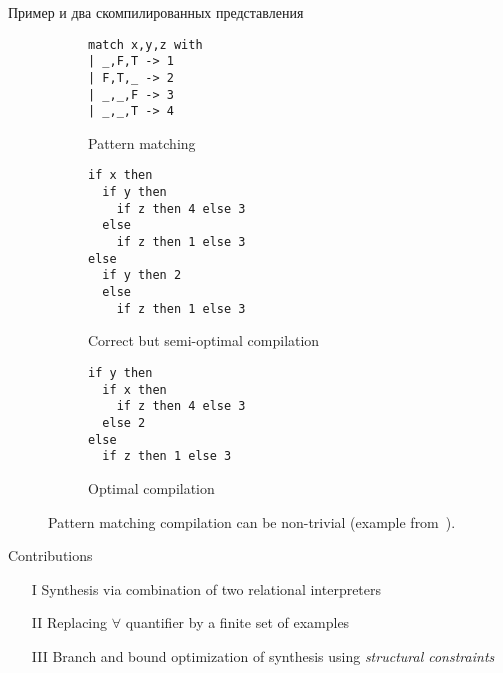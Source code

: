 \documentclass[aspectratio=169
  , xcolor={svgnames}
  , hyperref={ colorlinks,citecolor=Blue
             , linkcolor=DarkRed,urlcolor=DarkBlue}
  , russian
  ]{beamer}
\newcommand{\contributions}{
\begin{enumerate}
\item[I] Synthesis via combination of two relational interpreters
\item[II] Replacing $\forall$ quantifier by a finite set of examples
\item[III] Branch and bound optimization of synthesis using \emph{structural constraints}
\end{enumerate}
}
\begin{document}
\begin{frame}[fragile]{Пример и два скомпилированных представления}
\begin{figure}[t]
\begin{subfigure}[t]{0.25\linewidth}
\begin{lstlisting}
match x,y,z with
| _,F,T -> 1
| F,T,_ -> 2
| _,_,F -> 3
| _,_,T -> 4
\end{lstlisting}
\caption{Pattern matching}
\end{subfigure}
\hspace{0.5cm}
\begin{subfigure}[t]{0.32\linewidth}
\begin{lstlisting}
if x then
  if y then
    if z then 4 else 3
  else
    if z then 1 else 3
else
  if y then 2
  else
    if z then 1 else 3
\end{lstlisting}
\caption{Correct but semi-optimal compilation}
\end{subfigure}
\hspace{0.5cm}
\begin{subfigure}[t]{0.3\linewidth}
\centering
\begin{lstlisting}
if y then
  if x then
    if z then 4 else 3
  else 2
else
  if z then 1 else 3
\end{lstlisting}
\caption{Optimal compilation}
\end{subfigure}
\caption{Pattern matching compilation can be non-trivial (example from~\cite{maranget2008}).}\label{fig:match-example}
\end{figure}
\end{frame}

\begin{frame}{Contributions}
\Large
\contributions
\end{frame}
\end{document}

